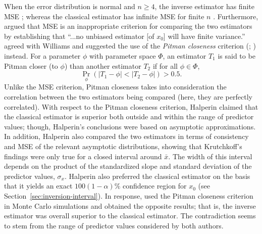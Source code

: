 \documentclass[cmfont,usenames,dvipsnames,leqno]{afit-etd}\usepackage[]{graphicx}\usepackage[]{color}
\newcommand{\Prob}{\operatorname{Pr}}
\begin{document}
When the error distribution is normal and $n \ge 4$, the inverse estimator has finite \ac{MSE} \citep{oman_exact_1985}; whereas the classical estimator has infinite \ac{MSE} for finite $n$ \citep{williams_note_1969}. Furthermore, \citet{williams_note_1969} argued that \ac{MSE} is an inappropriate criterion for comparing the two estimators by establishing that ``...no unbiased estimator [of $x_0$] will have finite variance.'' \citet{halperin_inverse_1970} agreed with Williams and suggested the use of the \textit{Pitman closeness} criterion (\citealt{pitman_closest_1937}; \citealt[pg. 290]{mood_introduction_1974}) instead. For a parameter $\phi$ with parameter space $\Phi$, an estimator $T_1$ is said to be Pitman closer (to $\phi$) than another estimator $T_2$ if for all $\phi \in \Phi$,
\begin{equation}
  \Prob_\phi\left(|T_1 - \phi| < |T_2 - \phi|\right) > 0.5.
\end{equation}
Unlike the \ac{MSE} criterion, Pitman closeness takes into consideration the correlation between the two estimators being compared (here, they are perfectly correlated). With respect to the Pitman closeness criterion, Halperin claimed that the classical estimator is superior both outside and within the range of predictor values; though, Halperin's conclusions were based on asymptotic approximations. In addition, Halperin also compared the two estimators in terms of consistency and \ac{MSE} of the relevant asymptotic distributions, showing that Krutchkoff's findings were only true for a closed interval around $\bar{x}$. The width of this interval depends on the product of the standardized slope and standard deviation of the predictor values, $\sigma_x$. Halperin also preferred the classical estimator on the basis that it yields an exact $100(1 - \alpha)\%$ confidence region for $x_0$ (see Section~\ref{sec:inversion-interval}). In response, \citet{krutchkoff_calibration_1972} used the Pitman closeness criterion in Monte Carlo simulations and obtained the opposite results; that is, the inverse estimator was overall superior to the classical estimator. The contradiction seems to stem from the range of predictor values considered by both authors.
\end{document}
